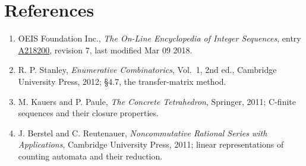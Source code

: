 \documentclass[11pt]{article}
\theoremstyle{definition}
\begin{document}
\section{References}

\begin{enumerate}

\item OEIS Foundation Inc., \emph{The On-Line Encyclopedia of Integer Sequences}, entry \href{https://oeis.org/A218200}{A218200}, revision 7, last modified Mar 09 2018.

\item R. P. Stanley, \emph{Enumerative Combinatorics}, Vol.~1, 2nd ed., Cambridge University Press, 2012; \S4.7, the transfer-matrix method.

\item M. Kauers and P. Paule, \emph{The Concrete Tetrahedron}, Springer, 2011; C-finite sequences and their closure properties.

\item J. Berstel and C. Reutenauer, \emph{Noncommutative Rational Series with Applications}, Cambridge University Press, 2011; linear representations of counting automata and their reduction.

\end{enumerate}
\end{document}
